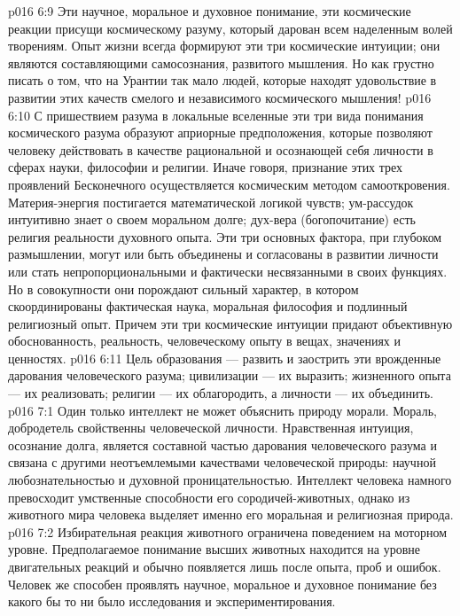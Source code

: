 \vs p016 6:9 \pc Эти научное, моральное и духовное понимание, эти космические реакции присущи космическому разуму, который дарован всем наделенным волей творениям. Опыт жизни всегда формируют эти три космические интуиции; они являются составляющими самосознания, развитого мышления. Но как грустно писать о том, что на Урантии так мало людей, которые находят удовольствие в развитии этих качеств смелого и независимого космического мышления!
\vs p016 6:10 \pc С пришествием разума в локальные вселенные эти три вида понимания космического разума образуют априорные предположения, которые позволяют человеку действовать в качестве рациональной и осознающей себя личности в сферах науки, философии и религии. Иначе говоря, признание  этих трех проявлений Бесконечного осуществляется космическим методом самооткровения. Материя\hyp{}энергия постигается математической логикой чувств; ум\hyp{}рассудок интуитивно знает о своем моральном долге; дух\hyp{}вера (богопочитание) есть религия реальности духовного опыта. Эти три основных фактора, при глубоком размышлении, могут или быть объединены и согласованы в развитии личности или стать непропорциональными и фактически несвязанными в своих функциях. Но в совокупности они порождают сильный характер, в котором скоординированы фактическая наука, моральная философия и подлинный религиозный опыт. Причем эти три космические интуиции придают объективную обоснованность, реальность, человеческому опыту в вещах, значениях и ценностях.
\vs p016 6:11 Цель образования --- развить и заострить эти врожденные дарования человеческого разума; цивилизации --- их выразить; жизненного опыта --- их реализовать; религии --- их облагородить, а личности --- их объединить.
\vs p016 7:1 Один только интеллект не может объяснить природу морали. Мораль, добродетель свойственны человеческой личности. Нравственная интуиция, осознание долга, является составной частью дарования человеческого разума и связана с другими неотъемлемыми качествами человеческой природы: научной любознательностью и духовной проницательностью. Интеллект человека намного превосходит умственные способности его сородичей\hyp{}животных, однако из животного мира человека выделяет именно его моральная и религиозная природа.
\vs p016 7:2 Избирательная реакция животного ограничена поведением на моторном уровне. Предполагаемое понимание высших животных находится на уровне двигательных реакций и обычно появляется лишь после опыта, проб и ошибок. Человек же способен проявлять научное, моральное и духовное понимание без какого бы то ни было исследования и экспериментирования.
